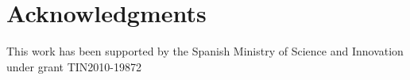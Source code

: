 \documentclass[conference]{IEEEtran}
\begin{document}
\section*{Acknowledgments}
This work has been supported by the
Spanish Ministry of Science and Innovation under grant
TIN2010-19872



%

%




\end{document}
